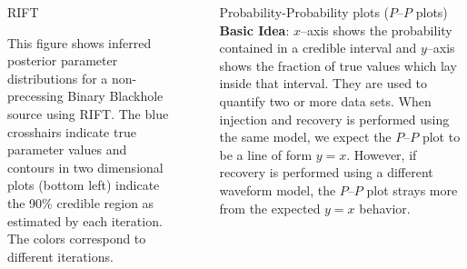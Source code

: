 \documentclass[serif]{beamer}
\begin{document}
\begin{frame}{}
\begin{columns}
\begin{column}[T]{.3\textwidth}
\begin{block}{RIFT}
\begin{center}
\end{center}


\small{
This figure shows inferred posterior parameter distributions for a non-precessing Binary Blackhole source using RIFT. The blue crosshairs indicate true parameter values and contours in two dimensional plots (bottom left) indicate the 90\% credible region as estimated by each iteration. The colors correspond to different iterations. 

}
\end{block}



\end{column}
~
\begin{column}[T]{0.35\textwidth}

\begin{block}{Probability-Probability plots ($P$--$P$ plots)} 
\textbf{Basic Idea}: $x$--axis shows the probability contained in a credible interval and $y$--axis shows the fraction of true values which lay inside that interval. They are used to quantify two or more data sets. When injection and recovery is performed using the same model, we expect the $P$--$P$ plot to be a line of form $y=x$.  However, if recovery is performed using a different waveform model, the $P$--$P$ plot strays more from the expected $y=x$ behavior.



\begin{center}
  \vspace{-1.450em}
  \begin{center}

    \begin{columns}
\end{columns}
\end{center}
\end{center}
\end{block}
\end{column}
\end{columns}
\end{frame}
\end{document}
